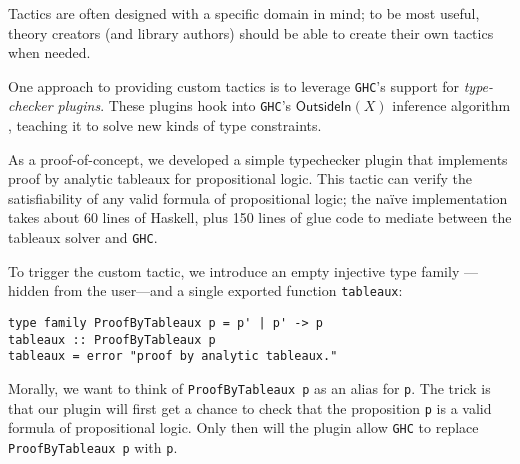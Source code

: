 \documentclass[format=sigplan, review=false, screen=true, 10pt]{acmart}
\begin{document}
Tactics are often designed with a specific domain in mind; to be most useful,
theory creators (and library authors) should be able to create their own tactics
when needed. 

One approach to providing custom tactics is to leverage \texttt{GHC}'s support for
\emph{type-checker plugins}. These plugins hook into \texttt{GHC}'s $\textsf{OutsideIn}(X)$
inference algorithm \cite{vytiniotis2011outsidein}, teaching it to solve
new kinds of type constraints.

As a proof-of-concept, we developed a simple typechecker plugin that implements
proof by analytic tableaux \cite{smullyan1995first} for propositional logic. This tactic
can verify the satisfiability of any
valid formula of propositional logic; the na\"ive implementation takes about
60 lines of Haskell, plus 150 lines of glue code to mediate between
the tableaux solver and \texttt{GHC}.

To trigger the custom tactic, we introduce an empty injective type family \cite{stolarek2015injective}---hidden from the user---and a single exported function \texttt{tableaux}:
\begin{verbatim}
type family ProofByTableaux p = p' | p' -> p
tableaux :: ProofByTableaux p
tableaux = error "proof by analytic tableaux."
\end{verbatim}
Morally, we want to think of \texttt{ProofByTableaux p} as an alias for \texttt{p}.
The trick is that our plugin will first get a chance to check that the proposition \texttt{p} is
a valid formula of propositional logic. Only then will the plugin allow \texttt{GHC}
to replace \texttt{ProofByTableaux p} with \texttt{p}.
\end{document}
